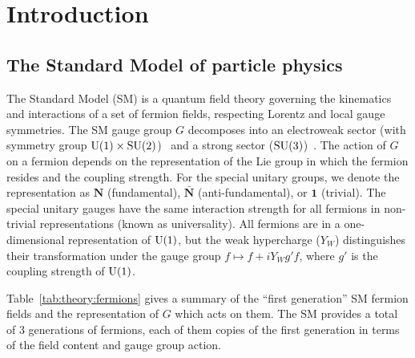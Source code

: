 \chapter{Introduction}
\label{sec:theory}

\section{The Standard Model of particle physics}

The Standard Model (SM) is a quantum field theory governing the kinematics and interactions of a set of fermion fields, respecting Lorentz and local gauge symmetries.
The SM gauge group $G$ decomposes into an electroweak sector (with symmetry group $\operatorname{\mathrm{U}}(1) \times \operatorname{\mathrm{SU}}(2)$)~\cite{weak1,weak2,weak3} and a strong sector ($\operatorname{\mathrm{SU}}(3)$)~\cite{qcd1,qcd2}.
The action of $G$ on a fermion depends on the representation of the Lie group in which the fermion resides and the coupling strength.
For the special unitary groups, we denote the representation as $\mathbf{N}$ (fundamental), $\bar{\mathbf{N}}$ (anti-fundamental), or $\mathbf{1}$ (trivial).
The special unitary gauges have the same interaction strength for all fermions in non-trivial representations (known as universality).
All fermions are in a one-dimensional representation of $\operatorname{\mathrm{U}}(1)$, but the weak hypercharge ($Y_W$) distinguishes their transformation under the gauge group $f\mapsto f + i Y_W g' f$, where $g'$ is the coupling strength of $\operatorname{\mathrm{U}}(1)$.

Table~\ref{tab:theory:fermions} gives a summary of the ``first generation'' SM fermion fields and the representation of $G$ which acts on them.
The SM provides a total of 3 generations of fermions, each of them copies of the first generation in terms of the field content and gauge group action.

